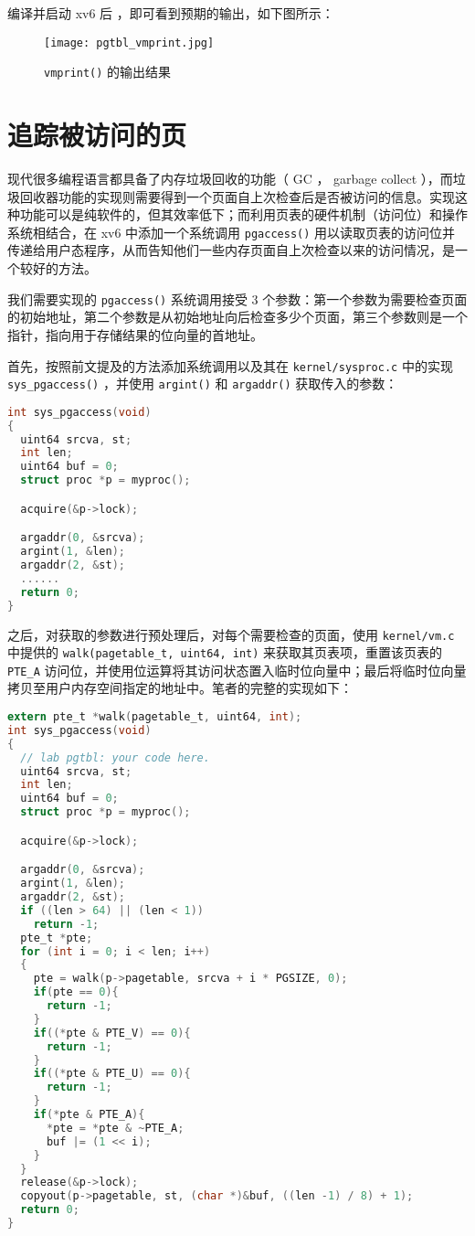 编译并启动 xv6 后 ，即可看到预期的输出，如下图所示：
\begin{figure}[H]
  \centering
  \texttt{[image: pgtbl\_vmprint.jpg]}
  \caption{ \lstinline{vmprint()} 的输出结果}
\end{figure}

\section{追踪被访问的页}

现代很多编程语言都具备了内存垃圾回收的功能（ GC ， garbage collect ），而垃圾回收器功能的实现则需要得到一个页面自上次检查后是否被访问的信息。实现这种功能可以是纯软件的，但其效率低下；而利用页表的硬件机制（访问位）和操作系统相结合，在 xv6 中添加一个系统调用 \lstinline{pgaccess()} 用以读取页表的访问位并传递给用户态程序，从而告知他们一些内存页面自上次检查以来的访问情况，是一个较好的方法。

我们需要实现的 \lstinline{pgaccess()} 系统调用接受 3 个参数：第一个参数为需要检查页面的初始地址，第二个参数是从初始地址向后检查多少个页面，第三个参数则是一个指针，指向用于存储结果的位向量的首地址。

首先，按照前文提及的方法添加系统调用以及其在 \lstinline{kernel/sysproc.c} 中的实现 \lstinline{sys_pgaccess()} ，并使用 \lstinline{argint()} 和 \lstinline{argaddr()} 获取传入的参数：
\begin{lstlisting}[language=C]
int sys_pgaccess(void)
{
  uint64 srcva, st;
  int len;
  uint64 buf = 0;
  struct proc *p = myproc();

  acquire(&p->lock);

  argaddr(0, &srcva);
  argint(1, &len);
  argaddr(2, &st);
  ......
  return 0;
}
\end{lstlisting}

之后，对获取的参数进行预处理后，对每个需要检查的页面，使用 \lstinline{kernel/vm.c} 中提供的 \lstinline{walk(pagetable_t, uint64, int)} 来获取其页表项，重置该页表的 \lstinline{PTE_A} 访问位，并使用位运算将其访问状态置入临时位向量中；最后将临时位向量拷贝至用户内存空间指定的地址中。笔者的完整的实现如下：
\begin{lstlisting}[language=C]
extern pte_t *walk(pagetable_t, uint64, int);
int sys_pgaccess(void)
{
  // lab pgtbl: your code here.
  uint64 srcva, st;
  int len;
  uint64 buf = 0;
  struct proc *p = myproc();

  acquire(&p->lock);

  argaddr(0, &srcva);
  argint(1, &len);
  argaddr(2, &st);
  if ((len > 64) || (len < 1))
    return -1;
  pte_t *pte;
  for (int i = 0; i < len; i++)
  {
    pte = walk(p->pagetable, srcva + i * PGSIZE, 0);
    if(pte == 0){
      return -1;
    }
    if((*pte & PTE_V) == 0){
      return -1;
    }
    if((*pte & PTE_U) == 0){
      return -1;
    }
    if(*pte & PTE_A){
      *pte = *pte & ~PTE_A;
      buf |= (1 << i);  
    }
  }
  release(&p->lock);
  copyout(p->pagetable, st, (char *)&buf, ((len -1) / 8) + 1);
  return 0;
}
\end{lstlisting}

